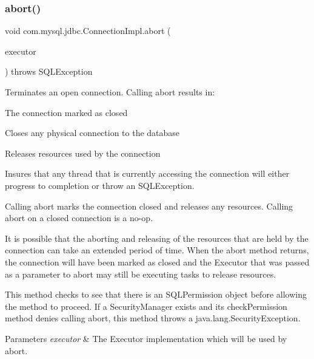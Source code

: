 \subsubsection{\texorpdfstring{abort()}{abort()}}
{\footnotesize\ttfamily void com.\+mysql.\+jdbc.\+Connection\+Impl.\+abort (\begin{DoxyParamCaption}\item[{Executor}]{executor }\end{DoxyParamCaption}) throws S\+Q\+L\+Exception}

Terminates an open connection. Calling {\ttfamily abort} results in\+: 
\begin{DoxyItemize}
\item The connection marked as closed 
\item Closes any physical connection to the database 
\item Releases resources used by the connection 
\item Insures that any thread that is currently accessing the connection will either progress to completion or throw an {\ttfamily S\+Q\+L\+Exception}. 
\end{DoxyItemize}

Calling {\ttfamily abort} marks the connection closed and releases any resources. Calling {\ttfamily abort} on a closed connection is a no-\/op. 

It is possible that the aborting and releasing of the resources that are held by the connection can take an extended period of time. When the {\ttfamily abort} method returns, the connection will have been marked as closed and the {\ttfamily Executor} that was passed as a parameter to abort may still be executing tasks to release resources. 

This method checks to see that there is an {\ttfamily S\+Q\+L\+Permission} object before allowing the method to proceed. If a {\ttfamily Security\+Manager} exists and its {\ttfamily check\+Permission} method denies calling {\ttfamily abort}, this method throws a {\ttfamily java.\+lang.\+Security\+Exception}.


\begin{DoxyParams}{Parameters}
{\em executor} & The {\ttfamily Executor} implementation which will be used by {\ttfamily abort}. \\
\hline
\end{DoxyParams}

